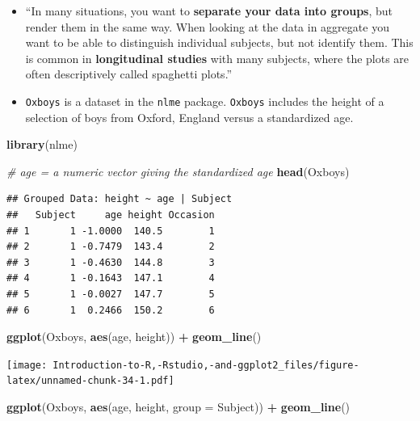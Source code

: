 \documentclass[]{book}
\newenvironment{Shaded}{\begin{snugshade}}{\end{snugshade}}
\newcommand{\CommentTok}[1]{\textcolor[rgb]{0.56,0.35,0.01}{\textit{#1}}}
\newcommand{\DataTypeTok}[1]{\textcolor[rgb]{0.13,0.29,0.53}{#1}}
\newcommand{\KeywordTok}[1]{\textcolor[rgb]{0.13,0.29,0.53}{\textbf{#1}}}
\newcommand{\NormalTok}[1]{#1}
\newcommand{\OperatorTok}[1]{\textcolor[rgb]{0.81,0.36,0.00}{\textbf{#1}}}
\newcommand{\StringTok}[1]{\textcolor[rgb]{0.31,0.60,0.02}{#1}}
\begin{document}
\begin{itemize}
\item
  ``In many situations, you want to \textbf{separate your data into groups}, but render them in the same way. When looking at the data in aggregate you want to be able to distinguish individual subjects, but not identify them. This is common in \textbf{longitudinal studies} with many subjects, where the plots are often descriptively called spaghetti plots.'' \citep{ggplot2}
\item
  \texttt{Oxboys} is a dataset in the \texttt{nlme} package. \texttt{Oxboys} includes the height of a selection of boys from Oxford, England versus a standardized age.
\end{itemize}

\begin{Shaded}
\begin{Highlighting}[]
\KeywordTok{library}\NormalTok{(nlme)}
\end{Highlighting}
\end{Shaded}

\begin{Shaded}
\begin{Highlighting}[]
\CommentTok{# age = a numeric vector giving the standardized age }
\KeywordTok{head}\NormalTok{(Oxboys)}
\end{Highlighting}
\end{Shaded}

\begin{verbatim}
## Grouped Data: height ~ age | Subject
##   Subject     age height Occasion
## 1       1 -1.0000  140.5        1
## 2       1 -0.7479  143.4        2
## 3       1 -0.4630  144.8        3
## 4       1 -0.1643  147.1        4
## 5       1 -0.0027  147.7        5
## 6       1  0.2466  150.2        6
\end{verbatim}

\begin{Shaded}
\begin{Highlighting}[]
\KeywordTok{ggplot}\NormalTok{(Oxboys, }\KeywordTok{aes}\NormalTok{(age, height)) }\OperatorTok{+}\StringTok{ }\KeywordTok{geom_line}\NormalTok{()}
\end{Highlighting}
\end{Shaded}

\texttt{[image: Introduction-to-R,-Rstudio,-and-ggplot2\_files/figure-latex/unnamed-chunk-34-1.pdf]}

\begin{Shaded}
\begin{Highlighting}[]
\KeywordTok{ggplot}\NormalTok{(Oxboys, }\KeywordTok{aes}\NormalTok{(age, height, }\DataTypeTok{group =}\NormalTok{ Subject)) }\OperatorTok{+}\StringTok{ }\KeywordTok{geom_line}\NormalTok{()}
\end{Highlighting}
\end{Shaded}
\end{document}
